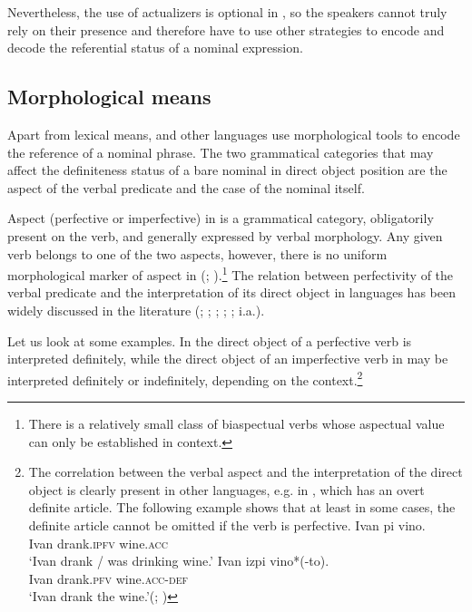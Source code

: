\documentclass[output=paper]{langscibook}
\begin{document}
\noindent Nevertheless, the use of actualizers is optional in , so the speakers cannot truly rely on their presence and therefore have to use other strategies to encode and decode the referential status of a nominal expression. %

\subsection{%
Morphological means}
Apart from lexical means,  and other  languages use %
 morphological tools to encode the reference of a nominal phrase. The two grammatical categories that may affect the definiteness status of a bare nominal in direct object position are the aspect of the verbal predicate and the case of the nominal itself.

Aspect (perfective or imperfective) in  is a grammatical category, obligatorily present on the %
verb, and generally expressed by verbal morphology. Any given verb belongs to one of the two aspects, however, there is no uniform morphological marker of aspect in  (\citealt{Klein1995}; \citealt{Borik2006}).\footnote{There is a relatively small class of biaspectual verbs whose aspectual value can only be established in  context.} The relation between perfectivity of the verbal predicate and the interpretation of its direct object in  languages has been widely discussed in the literature (\citealt{Wierzbicka1967}; \citealt{Krifka1992}; \citealt{Schoorlemmer1995}; \citealt{Verkuyl1999}; \citealt{Filip1993}; i.a.).

Let us look at some examples. In  the direct object of a perfective verb is interpreted definitely, while the direct object of an imperfective verb in  may be interpreted definitely or indefinitely, depending on the context.\footnote{The correlation between the verbal aspect and the interpretation of the direct object is clearly present in other  languages, e.g. in , which has an overt definite article. The following example shows that at least in some cases, the definite article cannot be omitted if the verb is perfective.
\ea
\ea \label{ex:seres:ia}
\gll	Ivan 	pi 					vino.\\
		Ivan 	drank.\textsc{ipfv} 	wine.\textsc{acc}\\
\glt		`Ivan drank / was drinking wine.'
\ex \label{ex:seres:ib}
\gll Ivan 	izpi 				vino*(-to).\\
		Ivan 	drank.\textsc{pfv} 	wine.\textsc{acc}-\textsc{def}\\
\glt `Ivan drank the wine.'\hfill (; \citealt[944]{Dimitrova-Vulchanova2012})
\z \z
}
\end{document}
